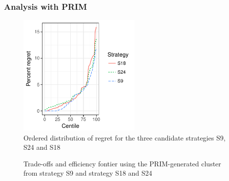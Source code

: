 
\clearpage

\subsubsection{Analysis with PRIM}



\begin{figure}[!htp]
	\centering
	\includegraphics[width=6cm]{figures/quantile_regret.pdf}
	\caption{Ordered distribution of regret for the three candidate strategies S9, S24 and S18}
	\label{fig:quantile_regret}
\end{figure}


\begin{figure}[!htp]
	\centering
	\caption{Trade-offs and efficiency fontier using the PRIM-generated cluster from strategy S9 and strategy S18 and S24}
	\label{fig_app:low_regret_frontier}
\end{figure}


